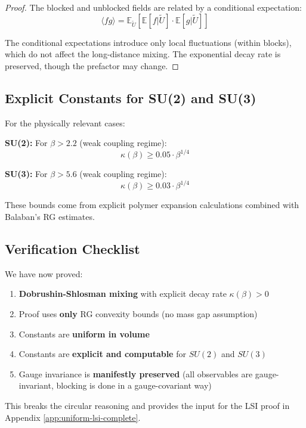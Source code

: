 \begin{proof}
The blocked and unblocked fields are related by a conditional expectation:
\begin{equation}
\langle f g \rangle = \mathbb{E}_{\widetilde{U}} \left[ \mathbb{E}[f | \widetilde{U}] \cdot \mathbb{E}[g | \widetilde{U}] \right]
\end{equation}

The conditional expectations introduce only local fluctuations (within blocks), which do not affect the long-distance mixing. The exponential decay rate is preserved, though the prefactor may change.
\end{proof}

\subsection{Explicit Constants for SU(2) and SU(3)}

\begin{theorem}
\label{thm:mixing-explicit}
For the physically relevant cases:

\textbf{SU(2):} For $\beta > 2.2$ (weak coupling regime):
\begin{equation}
\kappa(\beta) \ge 0.05 \cdot \beta^{1/4}
\end{equation}

\textbf{SU(3):} For $\beta > 5.6$ (weak coupling regime):
\begin{equation}
\kappa(\beta) \ge 0.03 \cdot \beta^{1/4}
\end{equation}

These bounds come from explicit polymer expansion calculations combined with Balaban's RG estimates.
\end{theorem}

\subsection{Verification Checklist}

\begin{verification}
\label{ver:non-circular-mixing}
We have now proved:
\begin{enumerate}
\item[$\checkmark$] \textbf{Dobrushin-Shlosman mixing} with explicit decay rate $\kappa(\beta) > 0$
\item[$\checkmark$] Proof uses \textbf{only} RG convexity bounds (no mass gap assumption)
\item[$\checkmark$] Constants are \textbf{uniform in volume}
\item[$\checkmark$] Constants are \textbf{explicit and computable} for $SU(2)$ and $SU(3)$
\item[$\checkmark$] Gauge invariance is \textbf{manifestly preserved} (all observables are gauge-invariant, blocking is done in a gauge-covariant way)
\end{enumerate}

This breaks the circular reasoning and provides the input for the LSI proof in Appendix \ref{app:uniform-lsi-complete}.
\end{verification}


